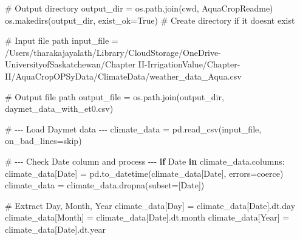 \documentclass[
  letterpaper,
  DIV=11,
  numbers=noendperiod]{scrartcl}
\newenvironment{Shaded}{\begin{snugshade}}{\end{snugshade}}
\newcommand{\CommentTok}[1]{\textcolor[rgb]{0.37,0.37,0.37}{#1}}
\newcommand{\ControlFlowTok}[1]{\textcolor[rgb]{0.00,0.23,0.31}{\textbf{#1}}}
\newcommand{\KeywordTok}[1]{\textcolor[rgb]{0.00,0.23,0.31}{\textbf{#1}}}
\newcommand{\NormalTok}[1]{\textcolor[rgb]{0.00,0.23,0.31}{#1}}
\newcommand{\OperatorTok}[1]{\textcolor[rgb]{0.37,0.37,0.37}{#1}}
\newcommand{\StringTok}[1]{\textcolor[rgb]{0.13,0.47,0.30}{#1}}
\newcommand{\VariableTok}[1]{\textcolor[rgb]{0.07,0.07,0.07}{#1}}
\begin{document}
\begin{Shaded}
\begin{Highlighting}[]
\CommentTok{\# Output directory}
\NormalTok{output\_dir }\OperatorTok{=}\NormalTok{ os.path.join(cwd, }\StringTok{\textquotesingle{}AquaCropReadme\textquotesingle{}}\NormalTok{)}
\NormalTok{os.makedirs(output\_dir, exist\_ok}\OperatorTok{=}\VariableTok{True}\NormalTok{)  }\CommentTok{\# Create directory if it doesn\textquotesingle{}t exist}

\CommentTok{\# Input file path}
\NormalTok{input\_file }\OperatorTok{=} \StringTok{\textquotesingle{}/Users/tharakajayalath/Library/CloudStorage/OneDrive{-}UniversityofSaskatchewan/Chapter II{-}IrrigationValue/Chapter{-}II/AquaCropOPSyData/ClimateData/weather\_data\_Aqua.csv\textquotesingle{}}

\CommentTok{\# Output file path}
\NormalTok{output\_file }\OperatorTok{=}\NormalTok{ os.path.join(output\_dir, }\StringTok{\textquotesingle{}daymet\_data\_with\_et0.csv\textquotesingle{}}\NormalTok{)}

\CommentTok{\# {-}{-}{-} Load Daymet data {-}{-}{-}}
\NormalTok{climate\_data }\OperatorTok{=}\NormalTok{ pd.read\_csv(input\_file, on\_bad\_lines}\OperatorTok{=}\StringTok{\textquotesingle{}skip\textquotesingle{}}\NormalTok{)}

\CommentTok{\# {-}{-}{-} Check Date column and process {-}{-}{-}}
\ControlFlowTok{if} \StringTok{\textquotesingle{}Date\textquotesingle{}} \KeywordTok{in}\NormalTok{ climate\_data.columns:}
\NormalTok{    climate\_data[}\StringTok{\textquotesingle{}Date\textquotesingle{}}\NormalTok{] }\OperatorTok{=}\NormalTok{ pd.to\_datetime(climate\_data[}\StringTok{\textquotesingle{}Date\textquotesingle{}}\NormalTok{], errors}\OperatorTok{=}\StringTok{\textquotesingle{}coerce\textquotesingle{}}\NormalTok{)}
\NormalTok{    climate\_data }\OperatorTok{=}\NormalTok{ climate\_data.dropna(subset}\OperatorTok{=}\NormalTok{[}\StringTok{\textquotesingle{}Date\textquotesingle{}}\NormalTok{])}
    
    \CommentTok{\# Extract Day, Month, Year}
\NormalTok{    climate\_data[}\StringTok{\textquotesingle{}Day\textquotesingle{}}\NormalTok{] }\OperatorTok{=}\NormalTok{ climate\_data[}\StringTok{\textquotesingle{}Date\textquotesingle{}}\NormalTok{].dt.day}
\NormalTok{    climate\_data[}\StringTok{\textquotesingle{}Month\textquotesingle{}}\NormalTok{] }\OperatorTok{=}\NormalTok{ climate\_data[}\StringTok{\textquotesingle{}Date\textquotesingle{}}\NormalTok{].dt.month}
\NormalTok{    climate\_data[}\StringTok{\textquotesingle{}Year\textquotesingle{}}\NormalTok{] }\OperatorTok{=}\NormalTok{ climate\_data[}\StringTok{\textquotesingle{}Date\textquotesingle{}}\NormalTok{].dt.year}


\end{Highlighting}
\end{Shaded}
\end{document}

